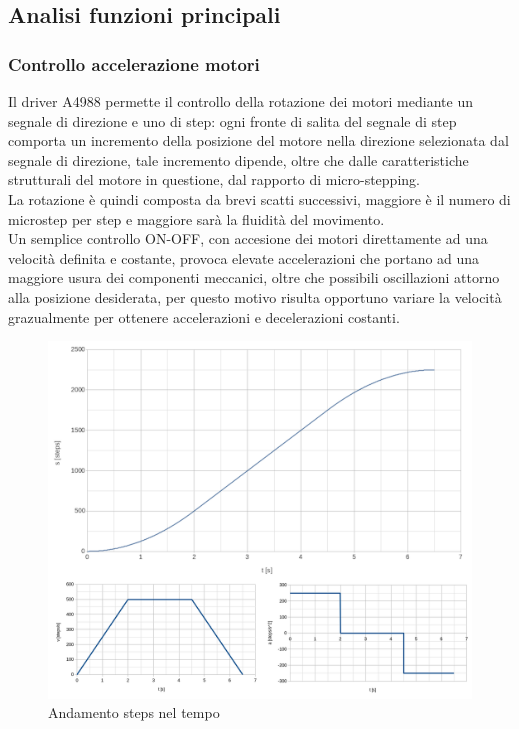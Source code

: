 \documentclass[12pt]{article}
\begin{document}
    \subsection{Analisi funzioni principali}
        \subsubsection{Controllo accelerazione motori}
        Il driver A4988 permette il controllo della rotazione dei motori mediante un segnale di direzione e uno di step: ogni fronte di salita del segnale di step comporta un incremento della posizione del motore nella direzione selezionata dal segnale di direzione, tale incremento dipende, oltre che dalle caratteristiche strutturali del motore in questione, dal rapporto di micro-stepping.\\
        La rotazione è quindi composta da brevi scatti successivi, maggiore è il numero di microstep per step e maggiore sarà la fluidità del movimento.\\
        Un semplice controllo ON-OFF, con accesione dei motori direttamente ad una velocità definita e costante, provoca elevate accelerazioni che portano ad una maggiore usura dei componenti meccanici, oltre che possibili oscillazioni attorno alla posizione desiderata, per questo motivo risulta opportuno variare la velocità grazualmente per ottenere accelerazioni e decelerazioni costanti.\\
        
        \begin{figure}[h]
        \centering
            \includegraphics[width=\textwidth-25pt]{Draws/Motors_s-v-a_block.png}
            \caption{Andamento steps nel tempo}
            \label{Steps_velocity_acceleration_in_time}
        \end{figure}
        
\end{document}

